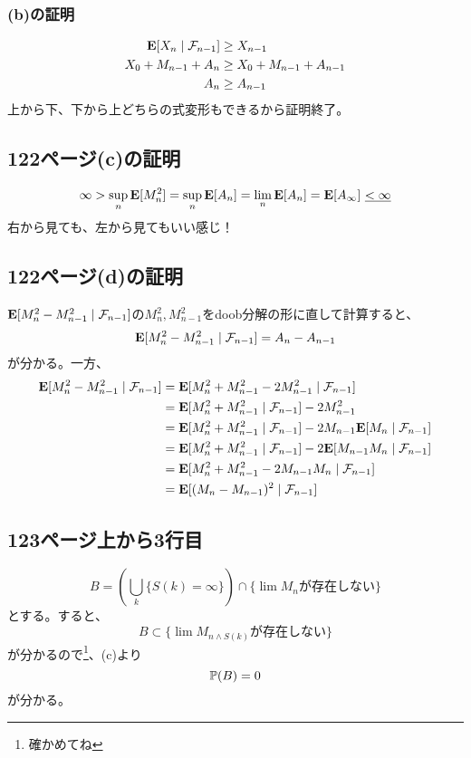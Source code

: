     \subsubsection{(b)の証明}
      \begin{align*}
        {\mathbf{E}}[X_n \mid \mathcal{F}_{n-1}] &\ge X_{n-1}\\
        X_0 + M_{n-1} + A_n &\ge X_0 + M_{n-1} + A_{n-1}\\
        A_n &\ge A_{n-1}
      \end{align*}
      上から下、下から上どちらの式変形もできるから証明終了。

  \subsection{122ページ(c)の証明}
    \[\infty > \sup_n {\mathbf{E}}[M_n^2] = \sup_n {\mathbf{E}}[A_n] = \lim_n {\mathbf{E}}[A_n] = {\mathbf{E}}[A_{\infty}]\,\,\underline{< \infty}\]
    右から見ても、左から見てもいい感じ！

  \subsection{122ページ(d)の証明}
    ${\mathbf{E}}[M_n^2 - M_{n-1}^2 \mid \mathcal{F}_{n-1}]$の$M_n^2,M_{n-1}^2$をdoob分解の形に直して計算すると、
    \[{\mathbf{E}}[M_n^2 - M_{n-1}^2 \mid \mathcal{F}_{n-1}]  = A_n - A_{n-1}\]
    が分かる。一方、
    \begin{align*}
      {\mathbf{E}}[M_n^2 - M_{n-1}^2 \mid \mathcal{F}_{n-1}] &= {\mathbf{E}}[M_n^2 + M_{n-1}^2 - 2M_{n-1}^2 \mid \mathcal{F}_{n-1}]\\
      &= {\mathbf{E}}[M_n^2 + M_{n-1}^2 \mid \mathcal{F}_{n-1}] - 2M_{n-1}^2 \\
      &= {\mathbf{E}}[M_n^2 + M_{n-1}^2 \mid \mathcal{F}_{n-1}] - 2M_{n-1}{\mathbf{E}}[M_{n} \mid \mathcal{F}_{n-1}] \\
      &= {\mathbf{E}}[M_n^2 + M_{n-1}^2 \mid \mathcal{F}_{n-1}] - 2{\mathbf{E}}[M_{n-1}M_{n} \mid \mathcal{F}_{n-1}] \\
      &= {\mathbf{E}}[M_n^2 + M_{n-1}^2 - 2M_{n-1}M_{n} \mid \mathcal{F}_{n-1}]\\
      &= {\mathbf{E}}[(M_n - M_{n-1})^2 \mid \mathcal{F}_{n-1}]
    \end{align*}

  \subsection{123ページ上から3行目}
    \[B = \left( \bigcup_k \{S(k) = \infty\} \right) \cap \{\lim M_n \text{が存在しない}\}\]
    とする。すると、
    \[B \subset \{\lim M_{n \wedge S(k)} \text{が存在しない}\}\]
    が分かるので\footnote{確かめてね}、(c)より
    \[{\mathbb{P}}(B) = 0\]
    が分かる。

